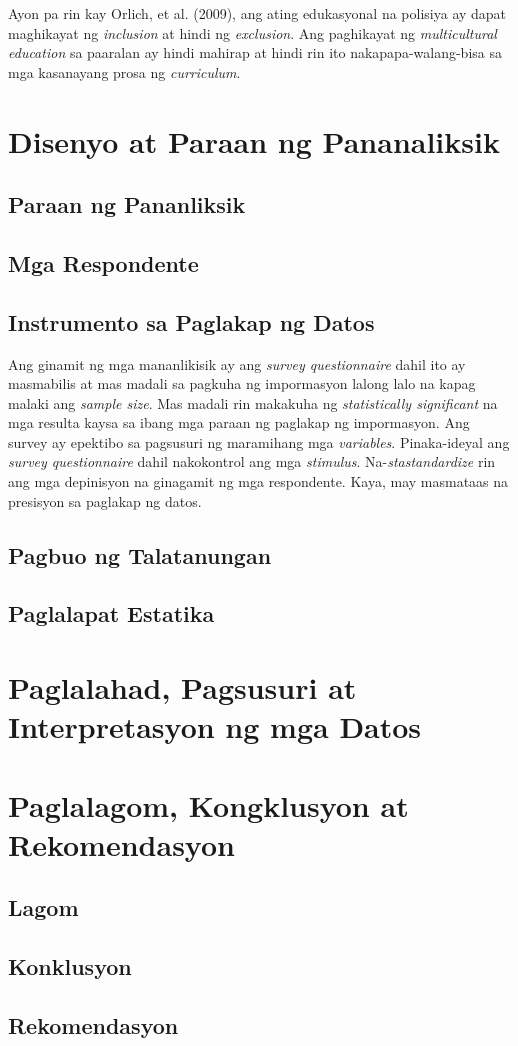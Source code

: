 \documentclass [11pt] {report}
\begin{document}
Ayon pa rin kay Orlich, et al. (2009), ang ating edukasyonal na polisiya ay
dapat maghikayat ng \emph{inclusion} at hindi ng \emph{exclusion}. Ang
paghikayat ng \emph{multicultural education} sa paaralan ay hindi mahirap at
hindi rin ito nakapapa-walang-bisa sa mga kasanayang prosa ng \emph{curriculum}.

\chapter{Disenyo at Paraan ng Pananaliksik}
\section{Paraan ng Pananliksik}
\section{Mga Respondente}
\section{Instrumento sa Paglakap ng Datos}
Ang ginamit ng mga mananlikisik ay ang \emph{survey questionnaire} dahil ito ay
masmabilis at mas madali sa pagkuha ng impormasyon lalong lalo na kapag malaki
ang \emph{sample size}. Mas madali rin makakuha ng \emph{statistically
  significant} na mga resulta kaysa sa ibang mga paraan ng paglakap ng
impormasyon. Ang survey ay epektibo sa pagsusuri ng maramihang mga
\emph{variables}. Pinaka-ideyal ang \emph{survey questionnaire } dahil
nakokontrol ang mga \emph{stimulus}. Na-\emph{stastandardize} rin ang mga
depinisyon na ginagamit ng mga respondente. Kaya, may masmataas na presisyon sa
paglakap ng datos.

\section{Pagbuo ng Talatanungan}
\section{Paglalapat Estatika}

\chapter{Paglalahad, Pagsusuri at Interpretasyon ng mga Datos}
\chapter{Paglalagom, Kongklusyon at Rekomendasyon}
\section{Lagom}
\section{Konklusyon}
\section{Rekomendasyon}



\end{document}
